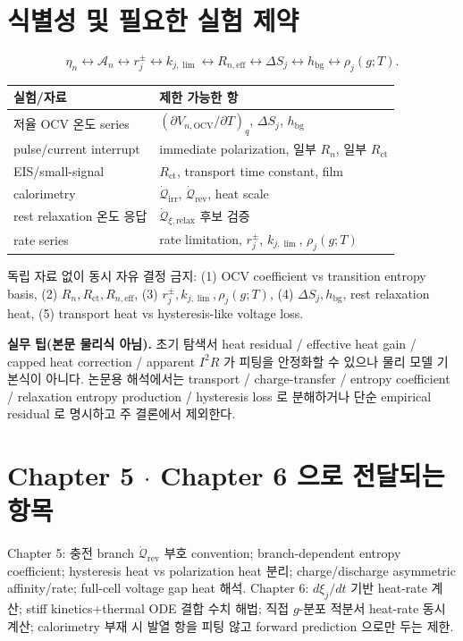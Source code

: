 \documentclass[11pt,a4paper]{article}
\newcommand{\eff}{\mathrm{eff}}
\newcommand{\bg}{\mathrm{bg}}
\newcommand{\OCV}{\mathrm{OCV}}
\newcommand{\irr}{\mathrm{irr}}
\newcommand{\rev}{\mathrm{rev}}
\newcommand{\rlx}{\mathrm{relax}}
\newcommand{\ct}{\mathrm{ct}}
\begin{document}
\section{식별성 및 필요한 실험 제약}\label{sec:ch4_ident}
\begin{equation}
\eta_n\leftrightarrow\mathcal A_n\leftrightarrow r_j^\pm\leftrightarrow k_{j,\lim}\leftrightarrow R_{n,\eff}\leftrightarrow\Delta S_j\leftrightarrow h_\bg\leftrightarrow\rho_j(g;T).
\label{eq:ch4_ident}
\end{equation}
\begin{longtable}{p{} p{}}
\toprule 실험/자료 & 제한 가능한 항 \\ \midrule \endhead
저율 OCV 온도 series & $(\partial V_{n,\OCV}/\partial T)_q$, $\Delta S_j$, $h_\bg$ \\
pulse/current interrupt & immediate polarization, 일부 $R_n$, 일부 $R_{\ct}$ \\
EIS/small-signal & $R_{\ct}$, transport time constant, film \\
calorimetry & $\dot{\mathcal Q}_{\irr}$, $\dot{\mathcal Q}_{\rev}$, heat scale \\
rest relaxation 온도 응답 & $\dot{\mathcal Q}_{\xi,\rlx}$ 후보 검증 \\
rate series & rate limitation, $r_j^\pm$, $k_{j,\lim}$, $\rho_j(g;T)$ \\
\bottomrule
\end{longtable}
독립 자료 없이 동시 자유 결정 금지: (1) OCV coefficient vs transition entropy basis, (2) $R_n,R_{\ct},R_{n,\eff}$,
(3) $r_j^\pm,k_{j,\lim},\rho_j(g;T)$, (4) $\Delta S_j,h_\bg$, rest relaxation heat, (5) transport heat vs
hysteresis-like voltage loss.

\begin{mdframed}
\textbf{실무 팁(본문 물리식 아님).} 초기 탐색서 heat residual / effective heat gain / capped heat correction /
apparent $I^2R$ 가 피팅을 안정화할 수 있으나 물리 모델 기본식이 아니다. 논문용 해석에서는 transport /
charge-transfer / entropy coefficient / relaxation entropy production / hysteresis loss 로 분해하거나 단순
empirical residual 로 명시하고 주 결론에서 제외한다.
\end{mdframed}

\section{Chapter 5 $\cdot$ Chapter 6 으로 전달되는 항목}\label{sec:ch4_transmit}
Chapter 5: 충전 branch $\dot{\mathcal Q}_{\rev}$ 부호 convention; branch-dependent entropy coefficient;
hysteresis heat vs polarization heat 분리; charge/discharge asymmetric affinity/rate; full-cell voltage gap
heat 해석. Chapter 6: $d\xi_j/dt$ 기반 heat-rate 계산; stiff kinetics+thermal ODE 결합 수치 해법; 직접
$g$-분포 적분서 heat-rate 동시 계산; calorimetry 부재 시 발열 항을 피팅 않고 forward prediction 으로만 두는 제한.
\end{document}
